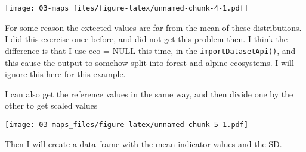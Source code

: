 \documentclass[
]{book}
\newenvironment{Shaded}{\begin{snugshade}}{\end{snugshade}}
\newcommand{\AttributeTok}[1]{\textcolor[rgb]{0.77,0.63,0.00}{#1}}
\newcommand{\DecValTok}[1]{\textcolor[rgb]{0.00,0.00,0.81}{#1}}
\newcommand{\FunctionTok}[1]{\textcolor[rgb]{0.00,0.00,0.00}{#1}}
\newcommand{\NormalTok}[1]{#1}
\newcommand{\OtherTok}[1]{\textcolor[rgb]{0.56,0.35,0.01}{#1}}
\newcommand{\SpecialCharTok}[1]{\textcolor[rgb]{0.00,0.00,0.00}{#1}}
\begin{document}
\texttt{[image: 03-maps\_files/figure-latex/unnamed-chunk-4-1.pdf]}

For some reason the extected values are far from the mean of these distributions. I did this exercise \href{https://ninanor.github.io/IBECA/jerv.html}{once before}, and did not get this problem then. I think the difference is that I use eco = NULL this time, in the \texttt{importDatasetApi()}, and this cause the output to somehow split into forest and alpine ecosystems. I will ignore this here for this example.

I can also get the reference values in the same way, and then divide one by the other to get scaled values

\begin{Shaded}
\end{Shaded}

\texttt{[image: 03-maps\_files/figure-latex/unnamed-chunk-5-1.pdf]}

Then I will create a data frame with the mean indicator values and the SD.
\end{document}
